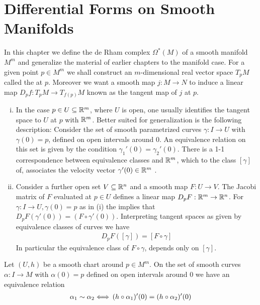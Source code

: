 \chapter{Differential Forms on Smooth Manifolds}
In this chapter we define the de Rham complex $\Omega^*(M)$ of a smooth manifold $M^m$
and generalize the material of earlier chapters to the manifold case.
For a given point $p\in M^m$ we shall construct an $m$-dimensional real 
vector space $T_pM$ called the  at $p$. Moreover we want a smooth 
map $j:M\to N$ to induce a linear map $D_pf:T_pM\to T_{f(p)}M$ known as the tangent 
map of $j$ at $p$.

\begin{remark}\label{remark:9-1}\;\par
  \begin{enumerate}[(i)]
    \item In the case $p\in U\subseteq\mathbb{R}^m$, where $U$ is open, one usually identifies the
      tangent space to $U$ at $p$ with $\mathbb{R}^m$. Better suited for generalization is the
      following description: Consider the set of smooth parametrized curves
      $\gamma:I\to U$ with $\gamma(0)=p$, defined on open intervals around 0.
      An equivalence relation on this set is given by the condition $\gamma_1'(0) = \gamma_2'(0)$.
      There is a 1-1 correspondence between equivalence classes and $\mathbb{R}^m$, which
      to the class $[\gamma]$ of, associates the velocity vector $\gamma'(0)\in\mathbb{R}^m$ .
    \item Consider a further open set $V\subseteq\mathbb{R}^n$ and a smooth map $F:U\to V$. The Jacobi 
      matrix of $F$ evaluated at $p\in U$ defines a linear map $D_pF:\mathbb{R}^m\to\mathbb{R}^n$. For $\gamma:I\to U,
      \gamma(0)= p$ as in (i) the  implies that $D_pF(\gamma'(0)) = (F\circ \gamma'(0))$. Interpreting 
      tangent spaces as given by equivalence classes of curves we have
      \begin{align}\label{eq:9-1}
        D_pF([\gamma]) = [F\circ \gamma]
      \end{align}
      In particular the equivalence class of $F\circ\gamma$, depends only on $[\gamma]$.
  \end{enumerate}
\end{remark}

Let $(U, h)$ be a smooth chart around $p\in M^m$. On the set of smooth curves
$\alpha:I\to M$ with $\alpha(0) = p$ defined on open intervals around 0 we have an 
equivalence relation
\begin{align}\label{eq:9-2}
  \alpha_1 \sim \alpha_2 
  \Longleftrightarrow\, (h\circ\alpha_1)'(0) = (h\circ\alpha_2)'(0)
\end{align}

